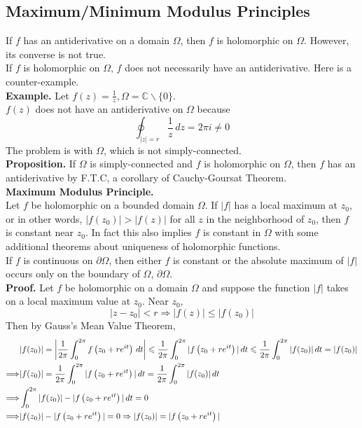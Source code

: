 \documentclass[11pt]{article}
\DeclarePairedDelimiter\abs{\lvert}{\rvert}
\begin{document}
\subsection{Maximum/Minimum Modulus Principles}
If $f$ has an antiderivative on a domain $\Omega$, then $f$ is holomorphic on $\Omega$. However, its converse is not true. \\
If $f$ is holomorphic on $\Omega$, $f$ does not necessarily have an antiderivative. Here is a counter-example.\\
\newline
\textbf{Example.} Let $f(z) = \frac{1}{z}, \Omega = \mathbb{C} \backslash \{0\}$. \\
$f(z)$ does not have an antiderivative on $\Omega$ because 
$$\oint_{|z| = r}\frac{1}{z} \,dz = 2\pi i \neq 0$$
The problem is with $\Omega$, which is not simply-connected. \\
\newline
\textbf{Proposition.} If $\Omega$ is simply-connected and $f$ is holomorphic on $\Omega$, then $f$ has an antiderivative by F.T.C, a corollary of Cauchy-Goursat Theorem. \\
\newline
\textbf{Maximum Modulus Principle.} \\
Let $f$ be holomorphic on a bounded domain $\Omega$. If $|f|$ has a local maximum at $z_0$, or in other words, $|f(z_0)| > |f(z)|$ for all $z$ in the neighborhood of $z_0$, 
then $f$ is constant near $z_0$. In fact this also implies $f$ is constant in $\Omega$ with some additional theorems about uniqueness of holomorphic functions. \\
If $f$ is continuous on $\partial \Omega$, then either $f$ is constant or the absolute maximum of $|f|$ occurs only on the boundary of $\Omega$, $\partial \Omega$. \\
\textbf{Proof.} Let $f$ be holomorphic on a domain $\Omega$ and suppose the function $|f|$ takes on a local maximum value at $z_0$. Near $z_0$, 
$$|z -z_0| < r \Rightarrow |f(z)| \leqslant |f(z_0)|$$
Then by Gauss's Mean Value Theorem, 
\begin{align*}
&|f(z_0)| = \abs*{\frac{1}{2\pi} \int_0^{2\pi}f\left(z_0 + re^{it}\right) \,dt} \leqslant \frac{1}{2\pi}\int_0^{2\pi} |f\left(z_0 + re^{it}\right)| \,dt \leqslant \frac{1}{2\pi}\int_0^{2\pi}|f(z_0)| \,dt = |f(z_0)| \\
\Longrightarrow &|f(z_0)| =  \frac{1}{2\pi}\int_0^{2\pi} |f\left(z_0 + re^{it}\right)| \,dt = \frac{1}{2\pi}\int_0^{2\pi}|f(z_0)| \,dt \\ 
\Longrightarrow &\int_0^{2\pi}|f(z_0)| - |f\left(z_0 + re^{it}\right)| \,dt = 0 \\
\Longrightarrow &|f(z_0)| - |f\left(z_0 + re^{it}\right)| = 0 \Rightarrow |f(z_0)| = |f\left(z_0 + re^{it}\right)|
\end{align*}
\end{document}
